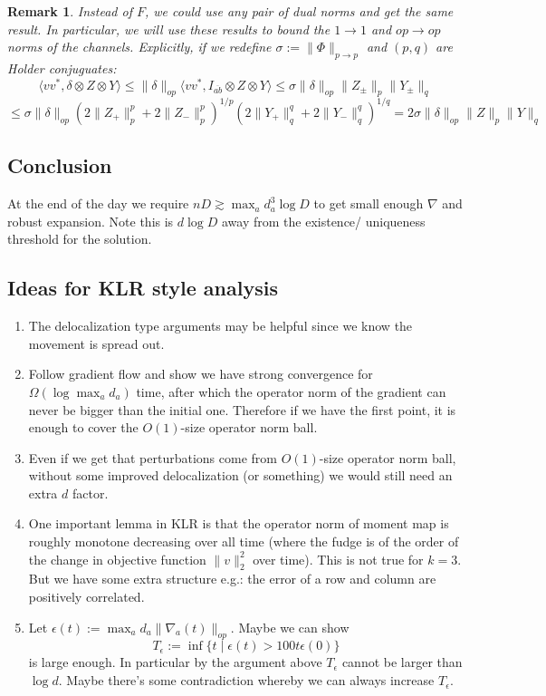 \documentclass{article}
\newtheorem{remark}{Remark}
\begin{document}
\begin{remark}
Instead of $F$, we could use any pair of dual norms and get the same result. In particular, we will use these results to bound the $1 \to 1$ and $op \to op$ norms of the channels. Explicitly, if we redefine $\sigma := \|\Phi\|_{p \to p}$ and $(p,q)$ are Holder conjuguates:
\[ \langle v v^{*}, \delta \otimes Z \otimes Y \rangle \leq \|\delta\|_{op} \langle v v^{*}, I_{\overline{ab}} \otimes Z \otimes Y \rangle \leq \sigma \|\delta\|_{op} \|Z_{\pm}\|_{p} \|Y_{\pm}\|_{q} \]
\[ \leq \sigma \|\delta\|_{op} (2\|Z_{+}\|_{p}^{p} + 2\|Z_{-}\|_{p}^{p})^{1/p} (2\|Y_{+}\|_{q}^{q} + 2\|Y_{-}\|_{q}^{q})^{1/q} = 2 \sigma \|\delta\|_{op} \|Z\|_{p} \|Y\|_{q}     \]
\end{remark}

\subsection{Conclusion}
At the end of the day we require $nD \gtrsim \max_{a} d_{a}^{3} \log D$ to get small enough $\nabla$ and robust expansion. Note this is $d \log D$ away from the existence/ uniqueness threshold for the solution.

\subsection{Ideas for KLR style analysis}
\begin{enumerate}
    \item The delocalization type arguments may be helpful since we know the movement is spread out.
    \item Follow gradient flow and show we have strong convergence for $\Omega(\log \max_{a} d_{a})$ time, after which the operator norm of the gradient can never be bigger than the initial one. Therefore if we have the first point, it is enough to cover the $O(1)$-size operator norm ball.
    \item Even if we get that perturbations come from $O(1)$-size operator norm ball, without some improved delocalization (or something) we would still need an extra $d$ factor.
    \item One important lemma in KLR is that the operator norm of moment map is roughly monotone decreasing over all time (where the fudge is of the order of the change in objective function $\|v\|_{2}^{2}$ over time). This is not true for $k=3$. But we have some extra structure e.g.: the error of a row and column are positively correlated.
    \item Let $\epsilon(t) := \max_{a} d_{a} \|\nabla_{a}(t)\|_{op}$. Maybe we can show
    \[ T_{\epsilon} := \inf \{ t \mid \epsilon(t) > 100 t \epsilon(0) \}  \]
    is large enough. In particular by the argument above $T_{\epsilon}$ cannot be larger than $\log d$. Maybe there's some contradiction whereby we can always increase $T_{\epsilon}$.
\end{enumerate}
\end{document}
